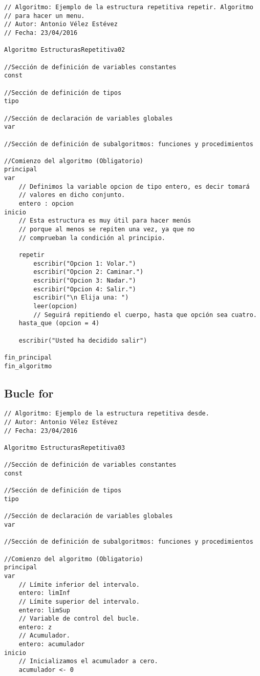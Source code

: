 \documentclass{article}
\begin{document}
\begin{appendices}
\begin{lstlisting}[language = pseudocodigoesp]
// Algoritmo: Ejemplo de la estructura repetitiva repetir. Algoritmo
// para hacer un menu.
// Autor: Antonio Vélez Estévez
// Fecha: 23/04/2016
  
Algoritmo EstructurasRepetitiva02

//Sección de definición de variables constantes
const 
	
//Sección de definición de tipos
tipo

//Sección de declaración de variables globales	
var

//Sección de definición de subalgoritmos: funciones y procedimientos	

//Comienzo del algoritmo (Obligatorio)
principal	
var
	// Definimos la variable opcion de tipo entero, es decir tomará
	// valores en dicho conjunto.
	entero : opcion
inicio 	
	// Esta estructura es muy útil para hacer menús
	// porque al menos se repiten una vez, ya que no
	// comprueban la condición al principio.
	
	repetir
		escribir("Opcion 1: Volar.")
		escribir("Opcion 2: Caminar.")
		escribir("Opcion 3: Nadar.")
		escribir("Opcion 4: Salir.")
		escribir("\n Elija una: ")
		leer(opcion)
		// Seguirá repitiendo el cuerpo, hasta que opción sea cuatro.
	hasta_que (opcion = 4)
	
	escribir("Usted ha decidido salir")

fin_principal
fin_algoritmo
  \end{lstlisting}
\subsection{Bucle for}
\begin{lstlisting}[language = pseudocodigoesp]
// Algoritmo: Ejemplo de la estructura repetitiva desde.
// Autor: Antonio Vélez Estévez
// Fecha: 23/04/2016
 
Algoritmo EstructurasRepetitiva03

//Sección de definición de variables constantes
const 
	
//Sección de definición de tipos
tipo

//Sección de declaración de variables globales	
var

//Sección de definición de subalgoritmos: funciones y procedimientos	

//Comienzo del algoritmo (Obligatorio)
principal	
var
	// Límite inferior del intervalo.
	entero: limInf
	// Límite superior del intervalo.
	entero: limSup
	// Variable de control del bucle.
	entero: z
	// Acumulador.
	entero: acumulador
inicio 	
	// Inicializamos el acumulador a cero.
	acumulador <- 0
	

\end{lstlisting}
\end{appendices}
\end{document}

